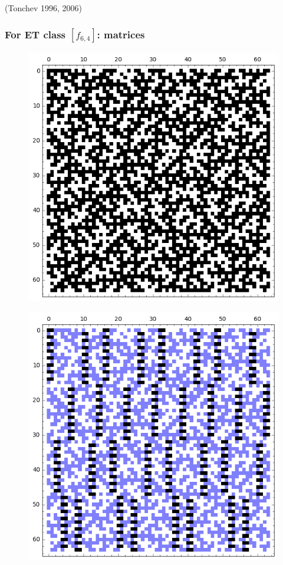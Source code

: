 \documentclass[pdf,sprung,slideColor,nocolorBG]{beamer}
\newenvironment{colortheme}[1]{
\def\ProvidesPackageRCS $##1${\relax}
\renewcommand{\ProcessOptions}{\relax}
\makeatletter

\makeatother
}{}
\newcommand{\slidecite}[1]{\tiny{(#1)}\normalsize{}}
\begin{document}
\begin{colortheme}{jubata}
\begin{frame}
\slidecite{Tonchev 1996, 2006}
\end{frame}
\begin{frame}
\frametitle{For ET class $[f_{6,4}]$: matrices}
\begin{figure}
\centering
\begin{minipage}{.48\textwidth}
  \centering
  \includegraphics[width=.9\linewidth]{../matrix_plot/c6_4_weight_class_matrix.png}
  \label{fig:6_4_weight_class_matrix}
\end{minipage}%
\begin{minipage}{.48\textwidth}
  \centering
  \includegraphics[width=.9\linewidth]{../matrix_plot/c6_4_bent_cayley_graph_index_matrix.png}
  \label{fig:6_4_bent_cayley_graph_index_matrix}
\end{minipage}
\end{figure}
\end{frame}

\end{colortheme}
\end{document}
